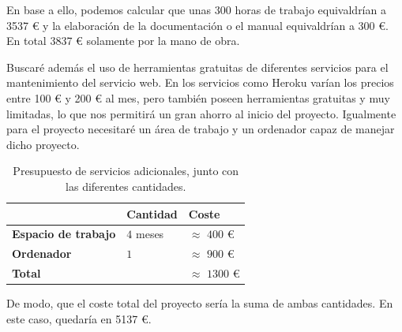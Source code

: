 En base a ello, podemos calcular que unas 300 horas de trabajo equivaldrían a 3537 € y la elaboración de la documentación o el manual equivaldrían a 300 €. En total 3837 € solamente por la mano de obra.

\vspace{0.3cm}

Buscaré además el uso de herramientas gratuitas de diferentes servicios para el mantenimiento del servicio web. En los servicios como Heroku varían los precios entre 100 € y 200 € al mes, pero también poseen herramientas gratuitas y muy limitadas, lo que nos permitirá un gran ahorro al inicio del proyecto. Igualmente para el proyecto necesitaré un área de trabajo y un ordenador capaz de manejar dicho proyecto.

\vspace{0.3cm}

\begin{table}[h]

    \centering
    \setlength\arrayrulewidth{0.8pt}

    \begin{tabular}{| >{\centering\arraybackslash}m{1.2in} | >{\centering\arraybackslash}m{0.8in} | >{\centering\arraybackslash}m{0.8in} |}

        \hline
        \rowcolor{RoyalBlue}
        \textbf{} & \textbf{Cantidad} & \textbf{Coste} \\
        \hline
        \cellcolor{RoyalBlue}\textbf{Espacio de trabajo} & $4$ meses & $\approx$ $400$ € \\
        \hline
        \cellcolor{RoyalBlue}\textbf{Ordenador} & $1$ & $\approx$ $900$ € \\
        \hline
        \cellcolor{RoyalBlue}\textbf{Total} && $\approx$ $1300$ € \\
        \hline

    \end{tabular}

    \caption[Presupuesto de servicios adicionales]{Presupuesto de servicios adicionales, junto con las diferentes cantidades.}\label{table:presupuesto-adicional}

\end{table}

De modo, que el coste total del proyecto sería la suma de ambas cantidades. En este caso, quedaría en 5137 €.
